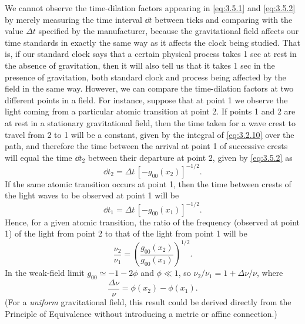 We cannot observe the time-dilation factors appearing in \eqref{eq:3.5.1}
and \eqref{eq:3.5.2} by merely measuring the time interval $\dd t$ between
ticks and comparing with the value $\Delta t$ specified by the manufacturer,
because the gravitational field affects our time standards in exactly the
same way as it affects the clock being studied. That is, if our standard
clock says that a certain physical process takes 1 sec at rest in the
absence of gravitation, then it will also tell us that it takes 1 sec in the
presence of gravitation, both standard clock and process being affected by
the field in the same way. However, we can compare the time-dilation factors
at two different points in a field. For instance, suppose that at point 1 we
observe the light coming from a particular atomic transition at point 2. If
points 1 and 2 are at rest in a stationary gravitational field, then the
time taken for a wave crest to travel from 2 to 1 will be a constant, given
by the integral of \eqref{eq:3.2.10} over the path, and therefore the time
between the arrival at point 1 of successive crests will equal the time
$\dd t_2$ between their departure at point 2, given by \eqref{eq:3.5.2} as
\[
  \dd t_2=\Delta t\,[-g_{00}(x_2)]^{-1/2}.
\]
If the same atomic transition occurs at point 1, then the time between crests
of the light waves to be observed at point 1 will be
\[
  \dd t_1=\Delta t\,[-g_{00}(x_1)]^{-1/2}.
\]
Hence, for a given atomic transition, the ratio of the frequency (observed at
point 1) of the light from point 2 to that of the light from point 1 will be
\begin{equation}
  \frac{\nu_2}{\nu_1}
  =\left(\frac{g_{00}(x_2)}{g_{00}(x_1)}\right)^{1/2}.
  \tag{3.5.3}\label{eq:3.5.3}
\end{equation}
In the weak-field limit $g_{00}\simeq-1-2\phi$ and $\phi\ll1$, so
$\nu_2/\nu_1=1+\Delta\nu/\nu$, where
\begin{equation}
  \frac{\Delta\nu}{\nu}=\phi(x_2)-\phi(x_1).
  \tag{3.5.4}\label{eq:3.5.4}
\end{equation}
(For a \emph{uniform} gravitational field, this result could be derived
directly from the Principle of Equivalence without introducing a metric or
affine connection.)

